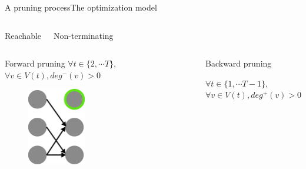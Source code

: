 \begin{frame}{A pruning process}{The optimization model}

\begin{columns}
Reachable

Non-terminating

\end{columns}

\begin{columns}


\begin{block}{Forward pruning}
$ \forall t \in \{ 2, \cdots T \}, $ \\
$ \forall v \in V(t), deg^{-}(v) > 0 $

\begin{figure}
\centering
\includegraphics[width = 0.4\textwidth]{./figure/forward_prune}
\end{figure}

\end{block}


\begin{block}{Backward pruning}

$ \forall t \in \{ 1, \cdots T-1 \}, $ \\
$ \forall v \in V(t), deg^{+}(v) > 0 $


\end{block}
\end{columns}
\end{frame}
